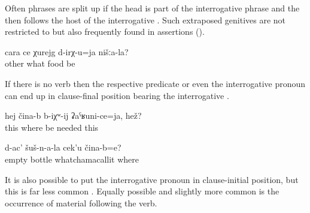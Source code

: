 Often  phrases are split up if the head is part of the interrogative phrase and the  then follows the host of the interrogative  . Such extraposed genitives are not restricted to  but also frequently found in assertions (). 

\begin{exe}
	\ex	\label{ex:‎What other dishes do we have}
	\gll	cara	ce	χurejg	d-irχ-u=ja	nišːa-la?\\
		other	what	food	be	\\
	\glt	{}
\end{exe}

If there is no verb then the respective predicate or even the interrogative pronoun can end up in clause-final position bearing the interrogative .

\begin{exe}
	\ex	\label{ex:‎This where should it be}
	\gll	hej	čina-b	b-iχʷ-ij	ʡaˁʁuni-ce=ja,	hež?\\
		this	where	be	needed	this\\
	\glt	{}

	\ex	\label{ex:‎Where is this (picture) of the empty bottles}
	\gll	d-ac'	šuš-n-a-la	cek'u	čina-b=e?\\
		empty	bottle	whatchamacallit	where\\
	\glt	{}
\end{exe}

It is also possible to put the interrogative pronoun in clause-initial position, but this is far less common . Equally possible and slightly more common is the occurrence of material following the verb.


